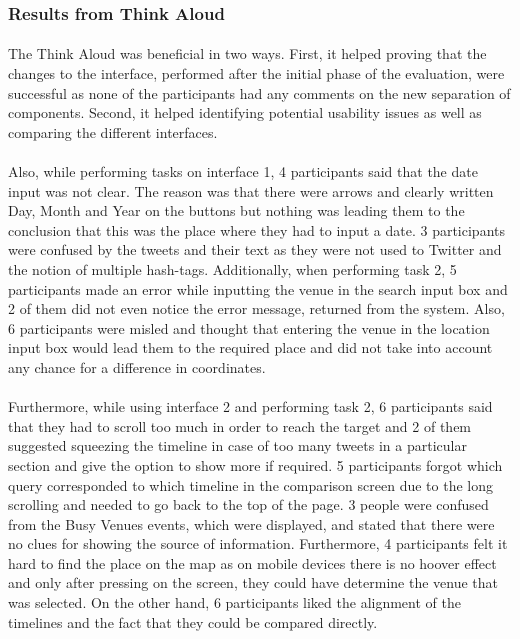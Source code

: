 \documentclass{l4proj}
\begin{document}
{\subsubsection{Results from Think Aloud}
\paragraph{}
The Think Aloud was beneficial in two ways. First, it helped proving that the changes to the interface, performed after the initial phase of the evaluation,  were successful as none of the participants had any comments on the new separation of components. Second, it helped identifying potential usability issues as well as comparing the different interfaces. 
\paragraph{}
Also, while performing tasks on interface 1, 4 participants said that the date input was not clear. The reason was that there were arrows and clearly written Day, Month and Year on the buttons but nothing was leading them to the conclusion that this was the place where they had to input a date. 3 participants were confused by the tweets and their text as they were not used to Twitter and the notion of multiple hash-tags. Additionally, when performing task 2, 5 participants made an error while inputting the venue in the search input box and 2 of them did not even notice the error message, returned from the system. Also, 6 participants were misled and thought that entering the venue in the location input box would lead them to the required place and did not take into account any chance for a difference in coordinates. 
\paragraph{}
Furthermore, while using interface 2 and performing task 2, 6 participants said that they had to scroll too much in order to reach the target and 2 of them suggested squeezing the timeline in case of too many tweets in a particular section and give the option to show more if required. 5 participants forgot which query corresponded to which timeline in the comparison screen due to the long scrolling and needed to go back to the top of the page. 3 people were confused from the Busy Venues events, which were displayed, and stated that there were no clues for showing the source of information. Furthermore, 4 participants felt it hard to find the place on the map as on mobile devices there is no hoover effect and only after pressing on the screen, they could have determine the venue that was selected. On the other hand, 6 participants liked the alignment of the timelines and the fact that they could be compared directly.
}
\end{document}
